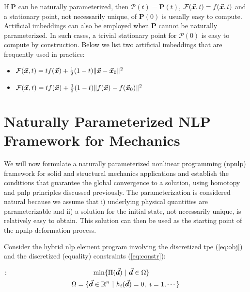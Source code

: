 \noindent If \textbf{P} can be naturally parameterized, then
$\bm{\mathcal{P}}(t)=$\textbf{P}$(t)$,
$\mathcal{F}(\vec{\bm{x}},t)=f(\vec{\bm{x}},t)$ and a stationary point, not necessarily
unique, of \textbf{P}$(0)$ is usually easy to compute. Artificial imbeddings can
also be employed when \textbf{P} cannot be naturally parameterized. In such
cases, a trivial stationary point for
$\bm{\mathcal{P}}(0)$ is easy to compute by construction. Below we list two 
artificial
imbeddings that are frequently used in practice:
\begin{itemize}
	\item $\mathcal{F}(\vec{\bm{x}},t) = t f(\vec{\bm{x}})+\frac{1}{2}(1-t)\Vert
	\vec{\bm{x}}-\vec{\bm{x}}_0\Vert ^2$
	\item $\mathcal{F}(\vec{\bm{x}},t) = t f(\vec{\bm{x}})+\frac{1}{2}(1-t)\Vert
	f(\vec{\bm{x}})-f(\vec{\bm{x}}_0)\Vert ^2$
\end{itemize}


\section{Naturally Parameterized NLP Framework for Mechanics}\label{CH4-S2}

We will now formulate a naturally parameterized nonlinear programming 
(\acrshort{npnlp})
framework for solid and structural mechanics applications and establish the
conditions that guarantee the global convergence to a solution, using homotopy
and \acrshort{pnlp} principles discussed previously. The parameterization is 
considered 
natural 
because we assume that i) underlying physical quantities are parameterizable and
ii) a solution for the initial state, not necessarily unique, is relatively 
easy to obtain. This solution can then be used as the starting point of the 
\acrshort{npnlp} deformation process. 

Consider the hybrid \acrshort{nlp} element program involving the discretized 
\acrshort{tpe} (\ref{eq:obj}) and the 
discretized (equality) constraints (\ref{eq:constr}):

\begin{subequations}
	\begin{gather}
		\hspace*{-5.4cm}\bmat{P}: \hspace*{4.4cm}
		\text{min}\{\Pi(\bvec{d}) \ |\
		\bvec{d}\in\Omega\}
		\label{eq:TPENP_ELEM}\\
		\Omega=\{\bvec{d}\in\mathbb{R}^n\ |\ h_i(\bvec{d})=0,\ i=1,\cdots \}
		\label{eq:NPNLPDOM_ELEM}
	\end{gather}
	\label{eq:NLP_ELEM}
\end{subequations}

